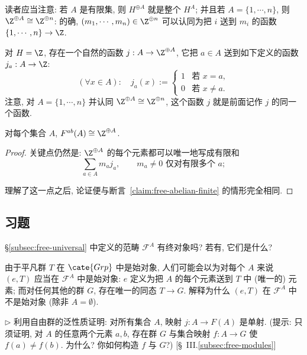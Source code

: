 读者应当注意: 若 $A$ 是有限集, 则 $H^{\oplus A}$ 就是整个 $H^A$; 并且若 $A = \{1, \cdots, n\}$, 则 $\Z^{\oplus A} \cong \Z^{\oplus n}$: 的确, $(m_1, \cdots, m_n) \in \Z^{\oplus n}$ 可以认同为把 $i$ 送到 $m_i$ 的函数 $\{1, \cdots, n\} \to \Z$.

对 $H = \Z$, 存在一个自然的函数 $j : A \to \Z^{\oplus A}$, 它把 $a \in A$ 送到如下定义的函数 $j_a : A \to \Z$:
\[
(\forall x \in A): \quad j_a(x) := \begin{cases} 1 & \text{若 } x = a, \\ 0 & \text{若 } x \neq a. \end{cases}
\]
注意, 对 $A = \{1, \cdots, n\}$ 并认同 $\Z^{\oplus A} \cong \Z^{\oplus n}$, 这个函数 $j$ 就是前面记作 $j$ 的同一个函数.

\begin{proposition}
\label{prop:free-abelian-general}
对每个集合 $A$, $F^{ab}(A) \cong \Z^{\oplus A}$.
\end{proposition}

\begin{proof}
关键点仍然是: $\Z^{\oplus A}$ 的每个元素都可以唯一地写成有限和
\[
\sum_{a \in A} m_a j_a, \qquad m_a \neq 0 \text{ 仅对有限多个 } a;
\]

理解了这一点之后, 论证便与断言~\ref{claim:free-abelian-finite} 的情形完全相同.
\end{proof}

\subsection*{习题}
{}

\begin{prob}
\label{ex:F-A-final}
\S\ref{subsec:free-universal} 中定义的范畴 $\mathcal{F}^A$ 有终对象吗? 若有, 它们是什么?
\end{prob}

\begin{prob}
\label{ex:trivial-not-initial}
由于平凡群 $T$ 在 $\cate{Grp}$ 中是始对象, 人们可能会以为对每个 $A$ 来说 $(e, T)$ 应当在 $\mathcal{F}^A$ 中是始对象: $e$ 定义为把 $A$ 的每个元素送到 $T$ 中 (唯一的) 元素; 而对任何其他的群 $G$, 存在唯一的同态 $T \to G$. 解释为什么 $(e, T)$ 在 $\mathcal{F}^A$ 中不是始对象 (除非 $A = \emptyset$).
\end{prob}

\begin{prob}
\label{ex:j-injective}
$\triangleright$ 利用自由群的泛性质证明: 对所有集合 $A$, 映射 $j : A \to F(A)$ 是单射. (提示: 只须证明, 对 $A$ 的任意两个元素 $a, b$, 存在群 $G$ 与集合映射 $f : A \to G$ 使 $f(a) \neq f(b)$. 为什么? 你如何构造 $f$ 与 $G$?) [\S~III.\ref{subsec:free-modules}]
\end{prob}

